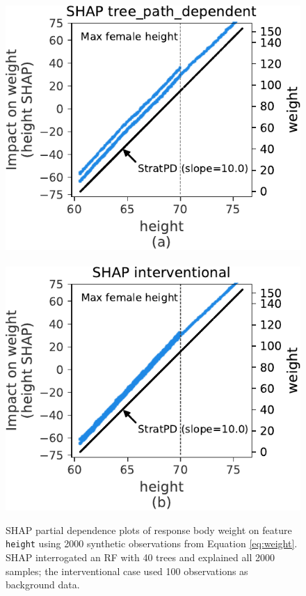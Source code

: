 \documentclass[11pt]{article}
\begin{document}
\begin{figure}[htbp]
\begin{center}
\includegraphics[scale=0.5]{images/weight-shap-tree_path_dependent.pdf}~~
\includegraphics[scale=0.5]{images/weight-shap-interventional.pdf}
\caption{\small SHAP partial dependence plots of response body weight on feature {\tt height} using 2000 synthetic observations from Equation \eqref{eq:weight}. SHAP interrogated an RF with 40 trees and explained all 2000 samples; the interventional case used 100 observations as background data.}
\label{fig:shap-weight}
\end{center}
\end{figure}
\end{document}
